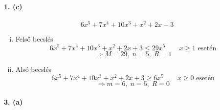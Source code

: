 \documentclass[12pt,a4paper,fleqn]{article}
\newcommand{\myparagraph}[1]{\paragraph{#1}\mbox{}}
\begin{document}
\myparagraph{1. (c)}
\[ 6x^5 + 7x^4 + 10x^3 + x^2 + 2x + 3 \]
\begin{enumerate}[i.]
  \item Felső becslés
  \[ 6x^5 + 7x^4 + 10x^3 + x^2 + 2x + 3 \leq 29x^5 \qquad x \geq 1 \text{ esetén}\]
  \[ \Rightarrow M = 29,\; n = 5,\; R = 1 \]
  \item Alsó becslés
  \[ 6x^5 + 7x^4 + 10x^3 + x^2 + 2x + 3 \geq 6x^5 \qquad x \geq 0 \text{ esetén}\]
  \[ \Rightarrow m = 6,\; n = 5,\; R = 0 \]
\end{enumerate}

\myparagraph{3. (a)}
\end{document}
